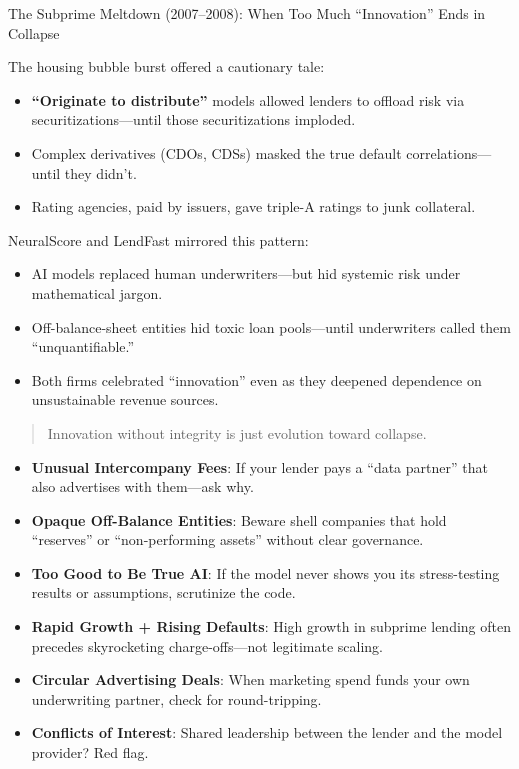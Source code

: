 \begin{HistoricalSidebar}{The Subprime Meltdown (2007–2008): When Too Much “Innovation” Ends in Collapse}

The housing bubble burst offered a cautionary tale:
\begin{itemize}
  \item  \textbf{“Originate to distribute”} models allowed lenders to offload risk via securitizations—until those securitizations imploded.
  \item  Complex derivatives (CDOs, CDSs) masked the true default correlations—until they didn’t.
  \item  Rating agencies, paid by issuers, gave triple-A ratings to junk collateral.
\end{itemize}

\medskip

NeuralScore and LendFast mirrored this pattern:
\begin{itemize}
  \item  AI models replaced human underwriters—but hid systemic risk under mathematical jargon.
  \item  Off-balance-sheet entities hid toxic loan pools—until underwriters called them “unquantifiable.”
  \item  Both firms celebrated “innovation” even as they deepened dependence on unsustainable revenue sources.
\end{itemize}

\begin{quote}
Innovation without integrity is just evolution toward collapse.
\end{quote}

\end{HistoricalSidebar}

\medskip

\begin{tcolorbox}[colback=gray!5!white, colframe=gray!50!black, breakable, title={Executive Checklist: Detecting a Credit Carousel}]
\begin{itemize}
  \item \textbf{Unusual Intercompany Fees}: If your lender pays a “data partner” that also advertises with them—ask why.
  \item \textbf{Opaque Off-Balance Entities}: Beware shell companies that hold “reserves” or “non-performing assets” without clear governance.
  \item \textbf{Too Good to Be True AI}: If the model never shows you its stress-testing results or assumptions, scrutinize the code.
  \item \textbf{Rapid Growth + Rising Defaults}: High growth in subprime lending often precedes skyrocketing charge-offs—not legitimate scaling.
  \item \textbf{Circular Advertising Deals}: When marketing spend funds your own underwriting partner, check for round-tripping.
  \item \textbf{Conflicts of Interest}: Shared leadership between the lender and the model provider? Red flag.
\end{itemize}
\end{tcolorbox}


